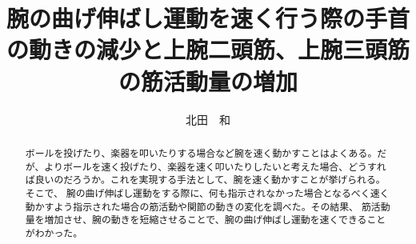 \documentclass{jsarticle}
\title{腕の曲げ伸ばし運動を速く行う際の手首の動きの減少と上腕二頭筋、上腕三頭筋の筋活動量の増加}
\author{北田　和}
\begin{document}
\maketitle


\begin{abstract}

  ボールを投げたり、楽器を叩いたりする場合など腕を速く動かすことはよくある。だが、よりボールを速く投げたり、楽器を速く叩いたりしたいと考えた場合、どうすれば良いのだろうか。これを実現する手法として、腕を速く動かすことが挙げられる。
  そこで、
  腕の曲げ伸ばし運動をする際に、何も指示されなかった場合となるべく速く動かすよう指示された場合の筋活動や関節の動きの変化を調べた。その結果、
 筋活動量を増加させ、腕の動きを短縮させることで、腕の曲げ伸ばし運動を速くできることがわかった。
\end{abstract}
\end{document}
